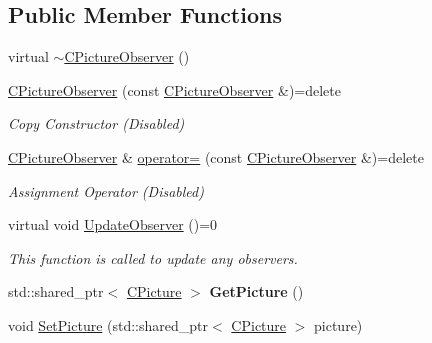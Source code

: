 \subsection*{Public Member Functions}
\begin{DoxyCompactItemize}
\item 
virtual \hyperlink{class_c_picture_observer_a86036f6ad66ae4bad3f204f61d234f46}{$\sim$\+C\+Picture\+Observer} ()
\item 
\hypertarget{class_c_picture_observer_a7c0cae97a7c165b98a00aeb2892cd6e7}{}\hyperlink{class_c_picture_observer_a7c0cae97a7c165b98a00aeb2892cd6e7}{C\+Picture\+Observer} (const \hyperlink{class_c_picture_observer}{C\+Picture\+Observer} \&)=delete\label{class_c_picture_observer_a7c0cae97a7c165b98a00aeb2892cd6e7}

\begin{DoxyCompactList}\small\item\em Copy Constructor (Disabled) \end{DoxyCompactList}\item 
\hypertarget{class_c_picture_observer_a200c66fe9ab13e18e9559033165b1895}{}\hyperlink{class_c_picture_observer}{C\+Picture\+Observer} \& \hyperlink{class_c_picture_observer_a200c66fe9ab13e18e9559033165b1895}{operator=} (const \hyperlink{class_c_picture_observer}{C\+Picture\+Observer} \&)=delete\label{class_c_picture_observer_a200c66fe9ab13e18e9559033165b1895}

\begin{DoxyCompactList}\small\item\em Assignment Operator (Disabled) \end{DoxyCompactList}\item 
\hypertarget{class_c_picture_observer_a0dce27216a8cb8a2490f0efc83a5994a}{}virtual void \hyperlink{class_c_picture_observer_a0dce27216a8cb8a2490f0efc83a5994a}{Update\+Observer} ()=0\label{class_c_picture_observer_a0dce27216a8cb8a2490f0efc83a5994a}

\begin{DoxyCompactList}\small\item\em This function is called to update any observers. \end{DoxyCompactList}\item 
\hypertarget{class_c_picture_observer_ab7613c4badd101ace6a992b2eaaea153}{}std\+::shared\+\_\+ptr$<$ \hyperlink{class_c_picture}{C\+Picture} $>$ {\bfseries Get\+Picture} ()\label{class_c_picture_observer_ab7613c4badd101ace6a992b2eaaea153}

\item 
void \hyperlink{class_c_picture_observer_a8f4bd1a0d4e3b14b511d572a6dadeb7e}{Set\+Picture} (std\+::shared\+\_\+ptr$<$ \hyperlink{class_c_picture}{C\+Picture} $>$ picture)
\end{DoxyCompactItemize}


